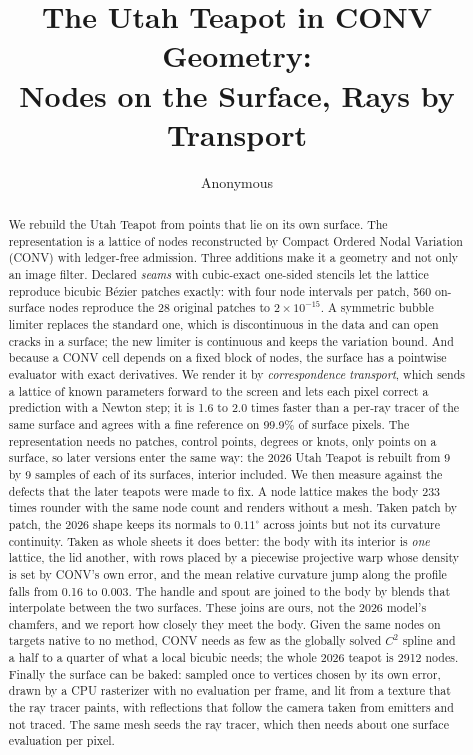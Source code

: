 \documentclass[journal]{IEEEtran}
\title{The Utah Teapot in CONV Geometry:\\ Nodes on the Surface, Rays by Transport}
\author{Anonymous}
\date{}
\begin{document}
\maketitle

\begin{abstract}
We rebuild the Utah Teapot from points that lie on its own surface. The
representation is a lattice of nodes reconstructed by Compact Ordered Nodal
Variation (CONV) with ledger-free admission. Three additions make it a
geometry and not only an image filter. Declared \emph{seams} with
cubic-exact one-sided stencils let the lattice reproduce bicubic B\'ezier
patches exactly: with four node intervals per patch, 560 on-surface nodes
reproduce the 28 original patches to $2\times10^{-15}$. A symmetric bubble
limiter replaces the standard one, which is discontinuous in the data and
can open cracks in a surface; the new limiter is continuous and keeps the
variation bound. And because a CONV cell depends on a fixed block of nodes,
the surface has a pointwise evaluator with exact derivatives. We render it
by \emph{correspondence transport}, which sends a lattice of known
parameters forward to the screen and lets each pixel correct a prediction
with a Newton step; it is 1.6 to 2.0 times faster than a per-ray tracer of
the same surface and agrees with a fine reference on 99.9\% of surface
pixels. The representation needs no patches, control points, degrees or
knots, only points on a surface, so later versions enter the same way: the
2026 Utah Teapot is rebuilt from 9 by 9 samples of each of its surfaces,
interior included. We then measure against the defects that the later
teapots were made to fix. A node lattice makes the body 233 times rounder
with the same node count and renders without a mesh. Taken patch by
patch, the 2026 shape keeps its normals to $0.11^\circ$ across joints
but not its curvature continuity. Taken as whole sheets it does better:
the body with its interior is \emph{one} lattice, the lid another, with
rows placed by a piecewise projective warp whose density is set by CONV's
own error, and the mean relative curvature jump along the profile falls
from 0.16 to 0.003. The handle and spout are joined to the body by blends
that interpolate between the two surfaces. These joins are ours, not the
2026 model's chamfers, and we report how closely they meet the body. Given the same
nodes on targets native to no method, CONV needs as few as the globally
solved $C^2$ spline and a half to a quarter of what a local bicubic
needs; the whole 2026 teapot is 2912 nodes. Finally the surface can be
baked: sampled once to vertices chosen by its own error, drawn by a CPU
rasterizer with no evaluation per frame, and lit from a texture that the
ray tracer paints, with reflections that follow the camera taken from
emitters and not traced. The same mesh seeds the ray tracer, which then
needs about one surface evaluation per pixel.
\end{abstract}
\end{document}
